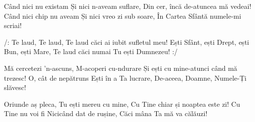 \beginverse
Când nici nu existam
Și nici n-aveam suflare,
Din cer, încă de-atuncea mă vedeai!
Când nici chip nu aveam
Și nici vreo zi sub soare,
În Cartea Sfântă numele-mi scriai!
\endverse

\beginchorus
/: Te laud, Te laud,
Te laud căci ai iubit sufletul meu!
Ești Sfânt, ești Drept, ești Bun, ești Mare,
Te laud căci numai Tu ești Dumnezeu! :/
\endchorus

\beginverse
Mă cercetezi 'n-ascuns,
M-acoperi cu-ndurare
Și ești cu mine-atunci când mă trezesc!
O, cât de nepătruns
Ești în a Ta lucrare,
De-aceea, Doamne, Numele-Ți slăvesc!
\endverse

\beginverse
Oriunde aș pleca,
Tu ești mereu cu mine,
Cu Tine chiar și noaptea este zi!
Cu Tine nu voi fi
Nicicând dat de rușine,
Căci mâna Ta mă va călăuzi!
\endverse
\endsong